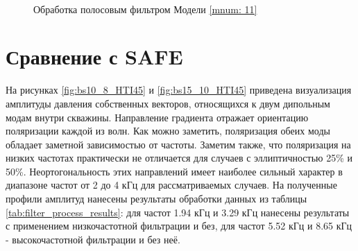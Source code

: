 \documentclass[a4paper,11pt]{article}
\begin{document}
\begin{figure}[h]
	\centering
	\begin{minipage}{0.98\linewidth}
		\centering %
		 \\
	\end{minipage}
	\caption{Обработка полосовым фильтром Модели \ref{mnum: 11}}
	\label{fig:bp_filter_graph_bs_hti_45}
\end{figure}

\section{Сравнение с SAFE}

На рисунках \ref{fig:bs10_8_HTI45} и \ref{fig:bs15_10_HTI45} приведена визуализация амплитуды давления собственных векторов, относящихся к двум дипольным модам внутри скважины. Направление градиента отражает ориентацию поляризации каждой из волн. Как можно заметить, поляризация обеих моды обладает заметной зависимостью от частоты. Заметим также, что поляризация на низких частотах практически не отличается для случаев с эллиптичностью 25\% и 50\%. Неортогональность этих направлений имеет наиболее сильный характер в диапазоне частот от 2 до 4 кГц для рассматриваемых случаев. На полученные профили амплитуд нанесены результаты обработки данных из таблицы \ref{tab:filter_process_results}: для частот 1.94 кГц и 3.29 кГц нанесены результаты с применением низкочастотной фильтрации и без, для частот 5.52 кГц и 8.65 кГц - высокочастотной фильтрации и без неё. 
\end{document}
